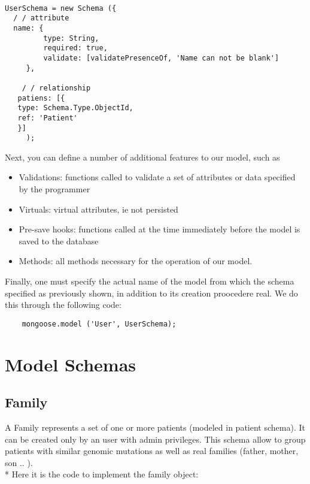 \begin{lstlisting} 

UserSchema = new Schema ({
  / / attribute
  name: {
         type: String,
         required: true,
         validate: [validatePresenceOf, 'Name can not be blank']
     },

    / / relationship
   patiens: [{
   type: Schema.Type.ObjectId,
   ref: 'Patient'
   }]
     ); 
\end{lstlisting}

Next, you can define a number of additional features to our model, such as

\begin{itemize}
	\item Validations: functions called to validate a set of attributes or data specified by the programmer
	\item Virtuals: virtual attributes, ie not persisted
	\item Pre-save hooks: functions called at the time immediately before the model is saved to the 				database
	\item Methods: all methods necessary for the operation of our model. 
\end{itemize}

Finally, one must specify the actual name of the model from which the schema specified as previously shown, in addition to its creation proocedere real. We do this through the following code:

\begin{lstlisting}
	mongoose.model ('User', UserSchema);
\end{lstlisting}

\section{Model Schemas}

\subsection{Family}
A Family represents a set of one or more patients (modeled in patient schema). It can be created only by an user with admin privileges. This schema allow to group patients with similar genomic mutations as well as real families (father, mother, son {..} ). \\*
Here it is the code to implement the family object: 



\newpage 

